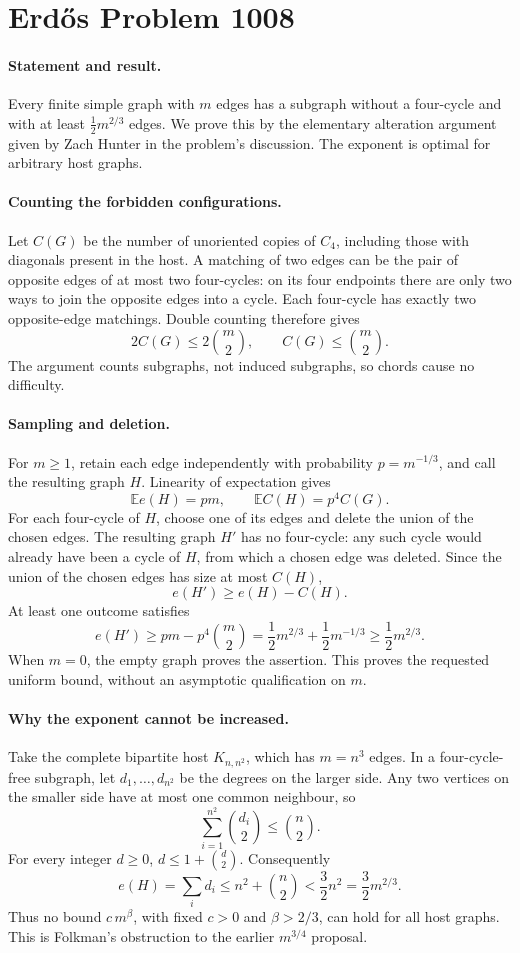 \section*{Erd\H{o}s Problem 1008}

\paragraph{Statement and result.}
Every finite simple graph with \(m\) edges has a subgraph without a four-cycle and with at least \(\tfrac12m^{2/3}\) edges. We prove this by the elementary alteration argument given by Zach Hunter in the problem's discussion. The exponent is optimal for arbitrary host graphs.

\paragraph{Counting the forbidden configurations.}
Let \(C(G)\) be the number of unoriented copies of \(C_4\), including those with diagonals present in the host. A matching of two edges can be the pair of opposite edges of at most two four-cycles: on its four endpoints there are only two ways to join the opposite edges into a cycle. Each four-cycle has exactly two opposite-edge matchings. Double counting therefore gives
\[
 2C(G)\leq 2\binom m2,\qquad C(G)\leq\binom m2.
\tag{1}
\]
The argument counts subgraphs, not induced subgraphs, so chords cause no difficulty.

\paragraph{Sampling and deletion.}
For \(m\geq1\), retain each edge independently with probability \(p=m^{-1/3}\), and call the resulting graph \(H\). Linearity of expectation gives
\[
 \mathbb E e(H)=pm,\qquad
 \mathbb E C(H)=p^4C(G).
\]
For each four-cycle of \(H\), choose one of its edges and delete the union of the chosen edges. The resulting graph \(H'\) has no four-cycle: any such cycle would already have been a cycle of \(H\), from which a chosen edge was deleted. Since the union of the chosen edges has size at most \(C(H)\),
\[
 e(H')\geq e(H)-C(H).
\]
At least one outcome satisfies
\[
 e(H')\geq pm-p^4\binom m2
 =\frac12m^{2/3}+\frac12m^{-1/3}
 \geq\frac12m^{2/3}.
\]
When \(m=0\), the empty graph proves the assertion. This proves the requested uniform bound, without an asymptotic qualification on \(m\).

\paragraph{Why the exponent cannot be increased.}
Take the complete bipartite host \(K_{n,n^2}\), which has \(m=n^3\) edges. In a four-cycle-free subgraph, let \(d_1,\ldots,d_{n^2}\) be the degrees on the larger side. Any two vertices on the smaller side have at most one common neighbour, so
\[
 \sum_{i=1}^{n^2}\binom{d_i}{2}\leq\binom n2.
\]
For every integer \(d\geq0\), \(d\leq1+\binom d2\). Consequently
\[
 e(H)=\sum_i d_i\leq n^2+\binom n2<\frac32n^2
 =\frac32m^{2/3}.
\]
Thus no bound \(c\,m^\beta\), with fixed \(c>0\) and \(\beta>2/3\), can hold for all host graphs. This is Folkman's obstruction to the earlier \(m^{3/4}\) proposal.

